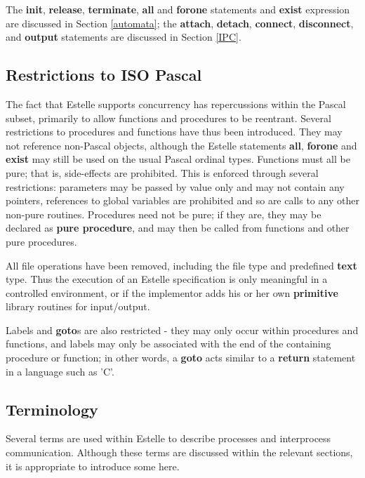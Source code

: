 The {\bf init}, {\bf release}, {\bf terminate}, {\bf all} and
{\bf forone} statements and {\bf exist} expression are discussed 
in Section \ref{automata}; the {\bf attach}, {\bf detach},
{\bf connect}, {\bf disconnect}, and {\bf output} statements
are discussed in Section \ref{IPC}.

\subsection[Restrictions to ISO Pascal]{Restrictions to ISO
Pascal}
\label{restrict}

The fact that Estelle supports concurrency has
repercussions within the Pascal subset, primarily to allow
functions and procedures to be reentrant. Several
restrictions to procedures and functions have thus been
introduced. They may not reference non-Pascal objects,
although the Estelle statements {\bf all}, {\bf forone} and {\bf
exist} may
still be used on the usual Pascal ordinal types. Functions
must all be pure; that is, side-effects are prohibited.
This is enforced through several restrictions: parameters
may be passed by value only and may not contain any
pointers, references to global variables are prohibited and
so are calls to any other non-pure routines. Procedures
need not be pure; if they are, they may be declared as {\bf pure
procedure}, and may then be called from functions and other
pure procedures.
 
All file operations have been removed, including the file
type and predefined {\bf text} type. Thus the execution of an
Estelle specification is only meaningful in a controlled
environment, or if the implementor adds his or her own
{\bf primitive} library routines for input/output.
 
Labels and {\bf goto}s are also restricted - they may only
occur within procedures and functions, and labels may only
be associated with the end of the containing procedure or
function; in other words, a {\bf goto} acts similar to a {\bf
return} statement in a language such as 'C'.

\subsection[Terminology]{Terminology}
\label{terminology}

Several terms are used within Estelle to describe
processes and interprocess communication. Although these
terms are discussed within the relevant sections, it is
appropriate to introduce some here.
 
